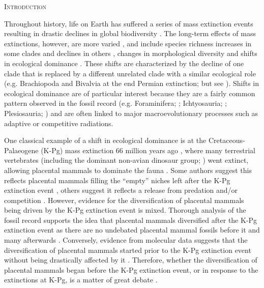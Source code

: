 \documentclass[12pt,letterpaper]{article}
\renewcommand{\section}[1]{%
\bigskip
\begin{center}
\begin{Large}
\normalfont\scshape #1
\medskip
\end{Large}
\end{center}}
\begin{document}
\section{Introduction}
Throughout history, life on Earth has suffered a series of mass extinction events resulting in drastic declines in global biodiversity \citep[e.g.][]{RaupPT,BentonPT,rennetime2013,Brusatte2015}.
The long-term effects of mass extinctions, however, are more varied \citep{Erwin1998344}, and include species richness increases in some clades \citep{friedmanexplosive2010} and declines in others \citep{Benton85}, changes in morphological diversity \citep{Ciampaglio2001,Ciampaglio2004,kornextinction2013} and shifts in ecological dominance \citep[e.g.][]{Brusatte12092008,toljagictriassic-jurassic2013,bensonfaunal2014}.
These shifts are characterized by the decline of one clade that is replaced by a different unrelated clade with a similar ecological role (e.g. Brachiopoda and Bivalvia at the end Permian extinction; \citealt{Liow2015} %
 but see \citealt{Payne22052014}). 
Shifts in ecological dominance are of particular interest because they are a fairly common pattern observed in the fossil record (e.g. Foraminifera; \citealt{Coxall01042006} %
; Ichtyosauria; \citealt{thorneresetting2011}; Plesiosauria; \citealt{bensonfaunal2014}) and are often linked to major macroevolutionary processes such as adaptive \citep{Losos2010} or competitive \citep{Brusatte12092008} radiations.

One classical example of a shift in ecological dominance is at the Cretaceous-Palaeogene (K-Pg) mass extinction 66 million years ago \citep{rennetime2013}, where many terrestrial vertebrates (including the dominant non-avian dinosaur group; \citealt{archibald2011extinction,rennetime2013,Brusatte2015}) went extinct, allowing placental mammals to dominate the fauna \citep{archibald2011extinction,Lovergrove}. 
Some authors suggest this reflects placental mammals filling the ``empty'' niches left after the K-Pg extinction event \citep{archibald2011extinction,OLeary08022013}, others suggest it reflects a release from predation and/or competition \citep{Slater2012MEE,Lovergrove}.
However, evidence for the diversification of placental mammals being driven by the K-Pg extinction event is mixed.
Thorough analysis of the fossil record \citep[e.g.][]{goswamia2011,OLeary08022013} supports the idea that placental mammals diversified after the K-Pg extinction event as there are no undebated placental mammal fossils before it and many afterwards \citep{archibald2011extinction,goswamia2011,Slater2012MEE,OLeary08022013,Wilson2013,Brusatte2015}. 
Conversely, evidence from molecular data suggests that the diversification of placental mammals started prior to the K-Pg extinction event without being drastically affected by it \citep[e.g.][]{Douady2003285,bininda2007delayed,meredithimpacts2011,Stadler12042011}.
Therefore, whether the diversification of placental mammals began before the K-Pg extinction event, or in response to the extinctions at K-Pg, is a matter of great debate \citep{dosReis2012,OLeary08022013,Springer09082013,OLeary09082013,dosReis2014}. 
\end{document}
